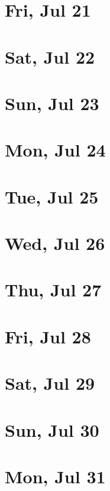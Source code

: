 	\section{Fri, Jul 21}
		
	\section{Sat, Jul 22}
		
	\section{Sun, Jul 23}
		
	\section{Mon, Jul 24}
		
	\section{Tue, Jul 25}
		
	\section{Wed, Jul 26}
		
	\section{Thu, Jul 27}
		
	\section{Fri, Jul 28}
		
	\section{Sat, Jul 29}
		
	\section{Sun, Jul 30}
		
	\section{Mon, Jul 31}
		
